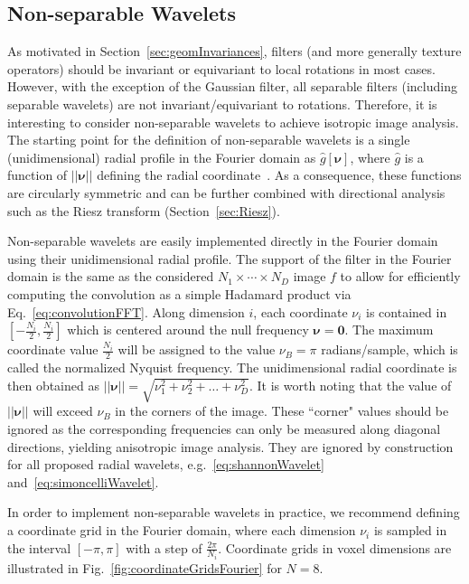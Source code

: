 \documentclass[fleqn,a4paper,oneside,openany]{book}
\begin{document}
\subsection{Non-separable Wavelets}\label{sec:nonseparableWavelets}
%
As motivated in  Section~\ref{sec:geomInvariances}, filters (and more generally texture operators) should be invariant or equivariant to local rotations in most cases. 
However, with the exception of the Gaussian filter, all separable filters (including separable wavelets) are not invariant/equivariant to rotations.
Therefore, it is interesting to consider non-separable wavelets to achieve isotropic image analysis.
The starting point for the definition of non-separable wavelets is a single (unidimensional) radial profile in the Fourier domain as $\hat{g}[\boldsymbol{\nu}]$, where $\hat{g}$ is a function of $||\boldsymbol{\nu}||$ defining the radial coordinate~\cite{UCV2011}.
As a consequence, these functions are circularly symmetric and can be further combined with directional analysis such as the Riesz transform (Section~\ref{sec:Riesz}).

Non-separable wavelets are easily implemented directly in the Fourier domain using their unidimensional radial profile.
The support of the filter in the Fourier domain is the same as the considered $N_1\times\cdots\times N_D$ image $f$ to allow for efficiently computing the convolution as a simple Hadamard product via Eq.~\eqref{eq:convolutionFFT}.
Along dimension $i$, each coordinate $\nu_i$ is contained in $[-\frac{N_i}{2},\frac{N_i}{2}]$ which is centered around the null frequency $\boldsymbol{\nu}=\boldsymbol{0}$.
The maximum coordinate value $\frac{N_i}{2}$ will be assigned to the value $\nu_{B}=\pi$ radians/sample, which is called the normalized Nyquist frequency.
The unidimensional radial coordinate is then obtained as $||\boldsymbol{\nu}||=\sqrt{\nu_1^2+\nu_2^2+\dots+\nu_D^2}$.
It is worth noting that the value of $||\boldsymbol{\nu}||$ will exceed $\nu_B$ in the corners of the image. These ``corner" values should be ignored as the corresponding frequencies can only be measured along diagonal directions, yielding anisotropic image analysis. They are ignored by construction for all proposed radial wavelets, e.g.~\eqref{eq:shannonWavelet} and~\eqref{eq:simoncelliWavelet}.


In order to implement non-separable wavelets in practice, we recommend defining a coordinate grid in the Fourier domain, where each dimension $\nu_i$ is sampled in the interval $[-\pi,\pi]$ with a step of $\frac{2\pi}{N_i}$.
Coordinate grids in voxel dimensions are illustrated in Fig.~\ref{fig:coordinateGridsFourier} for $N=8$.
\end{document}
